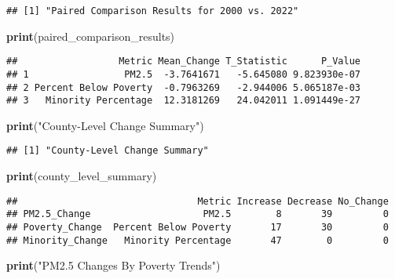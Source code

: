 \documentclass[
]{article}
\newenvironment{Shaded}{\begin{snugshade}}{\end{snugshade}}
\newcommand{\FunctionTok}[1]{\textcolor[rgb]{0.13,0.29,0.53}{\textbf{#1}}}
\newcommand{\NormalTok}[1]{#1}
\newcommand{\StringTok}[1]{\textcolor[rgb]{0.31,0.60,0.02}{#1}}
\begin{document}
\begin{verbatim}
## [1] "Paired Comparison Results for 2000 vs. 2022"
\end{verbatim}

\begin{Shaded}
\begin{Highlighting}[]
\FunctionTok{print}\NormalTok{(paired\_comparison\_results)}
\end{Highlighting}
\end{Shaded}

\begin{verbatim}
##                  Metric Mean_Change T_Statistic      P_Value
## 1                 PM2.5  -3.7641671   -5.645080 9.823930e-07
## 2 Percent Below Poverty  -0.7963269   -2.944006 5.065187e-03
## 3   Minority Percentage  12.3181269   24.042011 1.091449e-27
\end{verbatim}

\begin{Shaded}
\begin{Highlighting}[]
\FunctionTok{print}\NormalTok{(}\StringTok{"County{-}Level Change Summary"}\NormalTok{)}
\end{Highlighting}
\end{Shaded}

\begin{verbatim}
## [1] "County-Level Change Summary"
\end{verbatim}

\begin{Shaded}
\begin{Highlighting}[]
\FunctionTok{print}\NormalTok{(county\_level\_summary)}
\end{Highlighting}
\end{Shaded}

\begin{verbatim}
##                                Metric Increase Decrease No_Change
## PM2.5_Change                    PM2.5        8       39         0
## Poverty_Change  Percent Below Poverty       17       30         0
## Minority_Change   Minority Percentage       47        0         0
\end{verbatim}

\begin{Shaded}
\begin{Highlighting}[]
\FunctionTok{print}\NormalTok{(}\StringTok{"PM2.5 Changes By Poverty Trends"}\NormalTok{)}
\end{Highlighting}
\end{Shaded}
\end{document}
